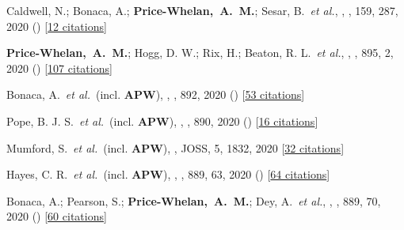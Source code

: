{\item[{\color{deemph}\scriptsize75}]Caldwell, N.; Bonaca, A.; \textbf{Price-Whelan,~A.~M.}; Sesar, B.~\textit{et al.}, , \aj, 159, 287, 2020 () [\href{http://adsabs.harvard.edu/abs/2020AJ....159..287C}{12 citations}]

\item[{\color{deemph}\scriptsize74}]\textbf{Price-Whelan,~A.~M.}; Hogg, D. W.; Rix, H.; Beaton, R. L.~\textit{et al.}, , \apj, 895, 2, 2020 () [\href{http://adsabs.harvard.edu/abs/2020ApJ...895....2P}{107 citations}]

\item[{\color{deemph}\scriptsize73}]Bonaca, A.~\textit{et al.}~(incl. \textbf{APW}), , \apj, 892, 2020 () [\href{http://adsabs.harvard.edu/abs/2020ApJ...892L..37B}{53 citations}]

\item[{\color{deemph}\scriptsize72}]Pope, B. J. S.~\textit{et al.}~(incl. \textbf{APW}), , \apj, 890, 2020 () [\href{http://adsabs.harvard.edu/abs/2020ApJ...890L..19P}{16 citations}]

\item[{\color{deemph}\scriptsize71}]Mumford, S.~\textit{et al.}~(incl. \textbf{APW}), , JOSS, 5, 1832, 2020 [\href{http://adsabs.harvard.edu/abs/2020JOSS....5.1832M}{32 citations}]

\item[{\color{deemph}\scriptsize70}]Hayes, C. R.~\textit{et al.}~(incl. \textbf{APW}), , \apj, 889, 63, 2020 () [\href{http://adsabs.harvard.edu/abs/2020ApJ...889...63H}{64 citations}]

\item[{\color{deemph}\scriptsize69}]Bonaca, A.; Pearson, S.; \textbf{Price-Whelan,~A.~M.}; Dey, A.~\textit{et al.}, , \apj, 889, 70, 2020 () [\href{http://adsabs.harvard.edu/abs/2020ApJ...889...70B}{60 citations}]

}
